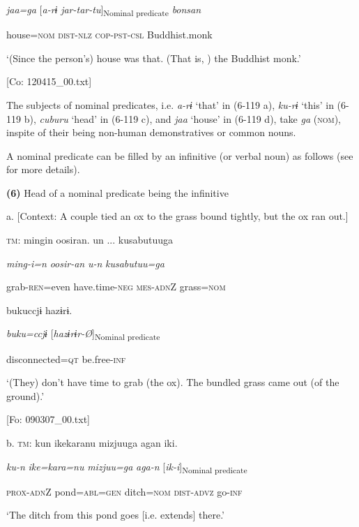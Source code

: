       \textit{jaa=ga}  [\textit{a-rɨ}  \textit{jar-tar-tu}]\textsubscript{Nominal predicate}  \textit{bonsan}

      house=\textsc{nom}  \textsc{dist}-\textsc{nlz}  \textsc{cop}-\textsc{pst}-\textsc{csl}  Buddhist.monk

      ‘(Since the person’s) house was that. (That is, ) the Buddhist monk.’

      [Co: 120415\_00.txt]

The subjects of nominal predicates, i.e. \textit{a-rɨ} ‘that’ in (6-119 a), \textit{ku-rɨ} ‘this’ in (6-119 b), \textit{cuburu} ‘head’ in (6-119 c), and \textit{jaa} ‘house’ in (6-119 d), take \textit{ga} (\textsc{nom}), inspite of their being non-human demonstratives or common nouns.

A nominal predicate can be filled by an infinitive (or verbal noun) as follows (see  for more details).

\textbf{(6)}  Head of a nominal predicate being the infinitive

  a.  [Context: A couple tied an ox to the grass bound tightly, but the ox ran out.]

    \textsc{tm}:  mingin  oosiran.  un ...  kusabutuuga

      \textit{ming-i=n}  \textit{oosir-an}  \textit{u-n}  \textit{kusabutuu=ga}

      grab-\textsc{ren}=even  have.time-\textsc{neg}  \textsc{mes}-\textsc{adn}Z  grass=\textsc{nom}

      bukuccjɨ  hazɨrɨ.

      \textit{buku=ccjɨ}  [\textit{hazɨrɨr-Ø}]\textsubscript{Nominal predicate}

      disconnected=\textsc{qt}  be.free-\textsc{inf}

      ‘(They) don’t have time to grab (the ox). The bundled grass came out (of the ground).’

      [Fo: 090307\_00.txt]

  b.  \textsc{tm}:  kun  {\textbar}ike{\textbar}karanu  mizjuuga  agan  iki.

      \textit{ku-n}  \textit{ike=kara=nu}  \textit{mizjuu=ga}  \textit{aga-n}  [\textit{ik-i}]\textsubscript{Nominal predicate}

      \textsc{prox}-\textsc{adn}Z  pond=\textsc{abl}=\textsc{gen}  ditch=\textsc{nom}  \textsc{dist}-\textsc{advz}  go{}-\textsc{inf}

      ‘The ditch from this pond goes [i.e. extends] there.’

